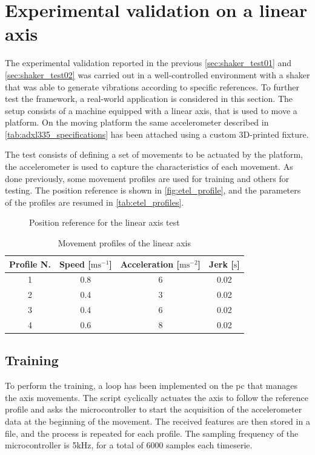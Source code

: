\clearpage
\section{Experimental validation on a linear axis}
\label{sec:ExperimentalValidation}

The experimental validation reported in the previous \autoref{sec:shaker_test01} and \autoref{sec:shaker_test02} was carried out in a well-controlled environment with a shaker that was able to generate vibrations according to specific references. To further test the framework, a real-world application is considered in this section. The setup consists of a machine equipped with a linear axis, that is used to move a platform. On the moving platform the same accelerometer described in \autoref{tab:adxl335_specifications} has been attached using a custom 3D-printed fixture.

The test consists of defining a set of movements to be actuated by the platform, the accelerometer is used to capture the characteristics of each movement. As done previously, some movement profiles are used for training and others for testing. The position reference is shown in \autoref{fig:etel_profile}, and the parameters of the profiles are resumed in \autoref{tab:etel_profiles}.

\begin{figure}
    \centering
    \todo%
    \caption{Position reference for the linear axis test}
    \label{fig:etel_profile}
\end{figure}

\begin{table}
    \centering
    \caption{Movement profiles of the linear axis}
    \label{tab:etel_profiles}
    \begin{tabular}{cccc} 
    \toprule
    \textbf{Profile N.} & \textbf{Speed} {[}$\text{m}\text{s}^{-1}$] & \textbf{Acceleration} {[}$\text{m}\text{s}^{-2}$] & \textbf{Jerk} {[}$\text{s}$] \\ 
    \hline
    1 & 0.8 & 6 & 0.02 \\
    2 & 0.4 & 3 & 0.02 \\
    3 & 0.4 & 6 & 0.02 \\
    4 & 0.6 & 8 & 0.02 \\
    \bottomrule
\end{tabular}
\end{table}

\subsection{Training}
To perform the training, a loop has been implemented on the \gls{pc} that manages the axis movements. The script cyclically actuates the axis to follow the reference profile and asks the microcontroller to start the acquisition of the accelerometer data at the beginning of the movement. The received features are then stored in a file, and the process is repeated for each profile. The sampling frequency of the microcontroller is 5kHz, for a total of 6000 samples each timeserie. 

